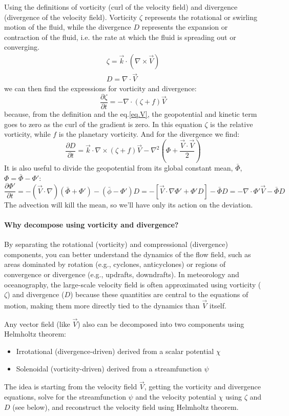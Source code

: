 Using the definitions of vorticity (curl of the velocity field) and divergence (divergence of the velocity field). Vorticity $\zeta$ represents the rotational or swirling motion of the fluid, while the divergence $D$ represents the expansion or contraction of the fluid, i.e. the rate at which the fluid is spreading out or converging.
\begin{align}
    \zeta=\vec{k}\cdot(\nabla\times \vec{V})\\
    D=\nabla\cdot\vec{V}
\end{align}
we can then find the expressions for vorticity and divergence:
\begin{equation}\label{eq.for vorticity and divergence}
    \frac{\partial\zeta}{\partial t}=-\nabla\cdot(\zeta +f)\vec{V}
\end{equation}
because, from the definition and the eq.\ref{eq.V}, the geopotential and kinetic term goes to zero as the curl of the gradient is zero. In this equation $\zeta$ is the relative vorticity, while $f$ is the planetary vorticity. And for the divergence we find:
\begin{equation}
    \frac{\partial D}{\partial t}=\vec{k}\cdot\nabla\times(\zeta+f)\vec{V}-\nabla^2\left(\Phi+\frac{\vec{V}\cdot\vec{V}}{2}\right)
\end{equation}
It is also useful to divide the geopotential from its global constant mean, $\bar{\Phi}$, $\Phi=\bar{\Phi}-\Phi'$:
$$\frac{\partial\Phi'}{\partial t}=-(\vec{V}\cdot\nabla)(\bar{\Phi}+\Phi')-(\bar{\phi}-\Phi')D=-[\vec{V}\cdot\nabla\Phi'+\Phi'D]-\bar{\Phi}D=-\nabla\cdot\Phi'\vec{V}-\bar{\Phi}D$$
The advection will kill the mean, so we'll have only its action on the deviation. 

\paragraph{Why decompose using vorticity and divergence?}
By separating the rotational (vorticity) and compressional (divergence) components, you can better understand the dynamics of the flow field, such as areas dominated by rotation (e.g., cyclones, anticyclones) or regions of convergence or divergence (e.g., updrafts, downdrafts).
In meteorology and oceanography, the large-scale velocity field is often approximated using vorticity ($\zeta$) and divergence ($D$) because these quantities are central to the equations of motion, making them more directly tied to the dynamics than $\vec{V}$ itself.


Any vector field (like $\vec{V}$) also can be decomposed into two components using Helmholtz theorem: 
\begin{itemize}
    \item Irrotational (divergence-driven) derived from a scalar potential $\chi$
    \item Solenoidal (vorticity-driven) derived from a streamfunction $\psi$
\end{itemize}
The idea is starting from the velocity field $\vec{V}$, getting the vorticity and divergence equations, solve for the streamfunction $\psi$ and the velocity potential $\chi$ using $\zeta$ and $D$ (see below), and reconstruct the velocity field using Helmholtz theorem.
